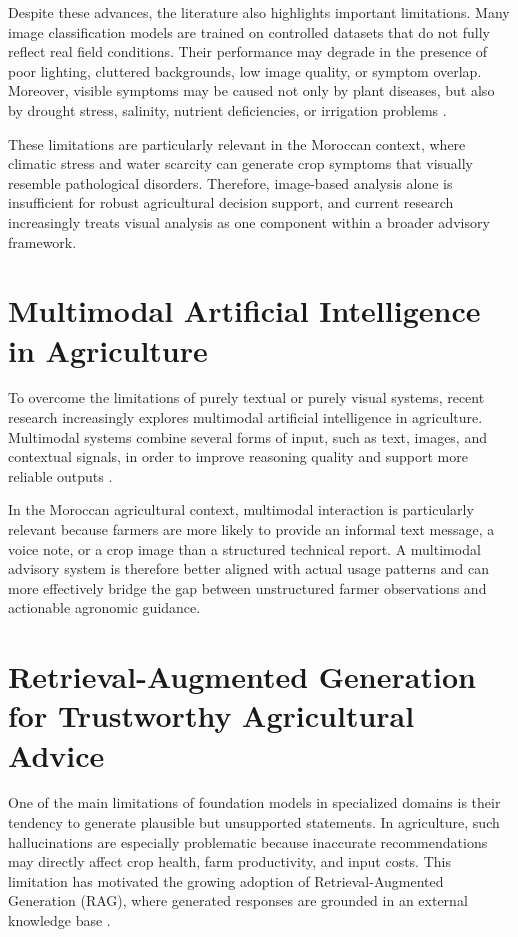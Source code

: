 Despite these advances, the literature also highlights important limitations. Many image classification models are trained on controlled datasets that do not fully reflect real field conditions. Their performance may degrade in the presence of poor lighting, cluttered backgrounds, low image quality, or symptom overlap. Moreover, visible symptoms may be caused not only by plant diseases, but also by drought stress, salinity, nutrient deficiencies, or irrigation problems \cite{yin2025foundation,zhu2025vlm}.

These limitations are particularly relevant in the Moroccan context, where climatic stress and water scarcity can generate crop symptoms that visually resemble pathological disorders. Therefore, image-based analysis alone is insufficient for robust agricultural decision support, and current research increasingly treats visual analysis as one component within a broader advisory framework.

\section{Multimodal Artificial Intelligence in Agriculture}

To overcome the limitations of purely textual or purely visual systems, recent research increasingly explores multimodal artificial intelligence in agriculture. Multimodal systems combine several forms of input, such as text, images, and contextual signals, in order to improve reasoning quality and support more reliable outputs \cite{zhu2025vlm,yin2025foundation}.

In the Moroccan agricultural context, multimodal interaction is particularly relevant because farmers are more likely to provide an informal text message, a voice note, or a crop image than a structured technical report. A multimodal advisory system is therefore better aligned with actual usage patterns and can more effectively bridge the gap between unstructured farmer observations and actionable agronomic guidance.

\section{Retrieval-Augmented Generation for Trustworthy Agricultural Advice}

One of the main limitations of foundation models in specialized domains is their tendency to generate plausible but unsupported statements. In agriculture, such hallucinations are especially problematic because inaccurate recommendations may directly affect crop health, farm productivity, and input costs. This limitation has motivated the growing adoption of Retrieval-Augmented Generation (RAG), where generated responses are grounded in an external knowledge base \cite{li2025llm,yin2025foundation}.

